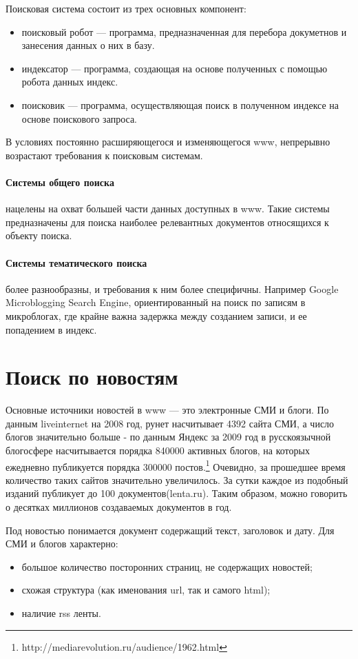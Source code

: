Поисковая система состоит из трех основных компонент: 
\begin{itemize}
 \item поисковый робот --- программа, предназначенная для перебора докуметнов и
занесения данных о них в базу. 
 \item индексатор --- программа, создающая на основе полученных с помощью робота данных индекс.
 \item поисковик --- программа, осуществляющая поиск в полученном индексе на основе поискового запроса.
\end{itemize} В условиях постоянно расширяющегося и изменяющегося www, непрерывно
возрастают требования к поисковым системам. 

\paragraph{Системы общего поиска} нацелены на охват большей части данных
доступных в www. Такие системы предназначены для поиска наиболее релевантных
документов относящихся к объекту поиска. 
\paragraph{Системы тематического поиска} более разнообразны, и требования к ним более специфичны.
 Например Google Microblogging Search Engine, ориентированный на поиск по записям в микроблогах,
где крайне важна задержка между созданием записи, и ее попадением в индекс.

\section{Поиск по новостям}

Основные источники новостей в www --- это электронные СМИ и блоги. По данным
liveinternet на 2008 год, рунет насчитывает 4392 сайта СМИ,
 а число блогов значительно больше - по данным Яндекс за 2009 год в русскоязычной блогосфере насчитывается порядка 840000 активных блогов, 
на которых ежедневно публикуется порядка 300000 постов.\footnote{http://mediarevolution.ru/audience/1962.html}
Очевидно, за прошедшее время количество таких сайтов значительно увеличилось. За сутки каждое
из подобный изданий публикует до 100 документов(lenta.ru). Таким образом, 
можно говорить о десятках миллионов создаваемых документов в год.

Под новостью понимается документ содержащий текст, заголовок и дату. Для СМИ и
блогов характерно:
\begin{itemize} 
 \item большое количество посторонних страниц, не содержащих новостей;
 \item схожая структура (как именования url, так и самого html);
 \item наличие rss ленты.
\end{itemize}

